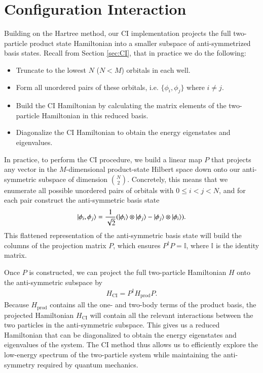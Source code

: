 \documentclass{subfiles}
\begin{document}
\section{Configuration Interaction}\label{sec:CI_method}
Building on the Hartree method, our CI implementation projects the full two-particle product state Hamiltonian into a smaller subspace of anti-symmetrized basis states. Recall from Section \ref{sec:CI}, that in practice we do the following:
\begin{itemize}
    \item Truncate to the lowest $N$ ($N<M$) orbitals in each well.
    \item Form all unordered pairs of these orbitals, i.e. $\{\phi_i, \phi_j\}$ where $i \neq j$.
    \item Build the CI Hamiltonian by calculating the matrix elements of the two-particle Hamiltonian in this reduced basis.
    \item Diagonalize the CI Hamiltonian to obtain the energy eigenstates and eigenvalues.
\end{itemize}
In practice, to perform the CI procedure, we build a linear map $P$ that projects any vector in the $M$-dimensional product-state Hilbert space down onto our anti-symmetric subspace of dimension $\binom{N}{2}$. Concretely, this means that we enumerate all possible unordered pairs of orbitals with $0\leq i < j < N$, and for each pair construct the anti-symmetric basis state
\begin{align*}
    \ket{\phi_i, \phi_j} = \frac{1}{\sqrt{2}}(\ket{\phi_i}\otimes\ket{\phi_j} - \ket{\phi_j}\otimes\ket{\phi_i}).
\end{align*}
This flattened representation of the anti-symmetric basis state will build the columns of the projection matrix $P$, which ensures $P^\dagger P = \mathbb{I}$, where $\mathbb{I}$ is the identity matrix. 

Once $P$ is constructed, we can project the full two-particle Hamiltonian $H$ onto the anti-symmetric subspace by
\begin{align*}
    H_{\text{CI}} = P^\dagger H_{\text{prod}} P.
\end{align*}
Because $H_{\text{prod}}$ contains all the one- and two-body terms of the product basis, the projected Hamiltonian $H_{\text{CI}}$ will contain all the relevant interactions between the two particles in the anti-symmetric subspace. This gives us a reduced Hamiltonian that can be diagonalized to obtain the energy eigenstates and eigenvalues of the system. The CI method thus allows us to efficiently explore the low-energy spectrum of the two-particle system while maintaining the anti-symmetry required by quantum mechanics. 
\end{document}
